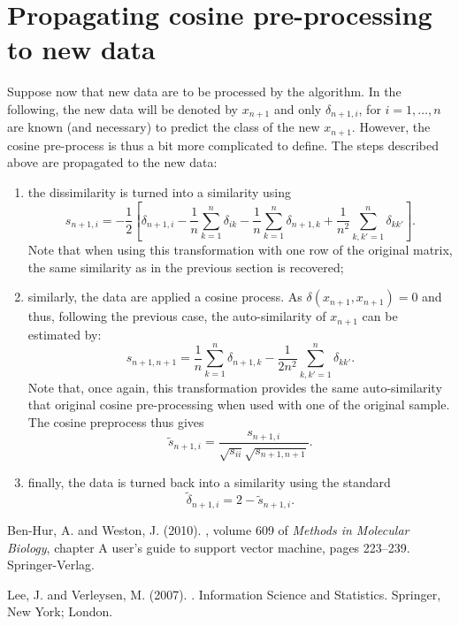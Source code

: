 \documentclass[a4paper,10pt]{scrartcl}
\begin{document}
\section{Propagating cosine pre-processing to new data}

Suppose now that new data are to be processed by the algorithm. In the
following, the new data will be denoted by $x_{n+1}$ and only $\delta_{n+1,i}$,
for $i=1,\ldots,n$ are known (and necessary) to predict the class of the new
$x_{n+1}$. However, the cosine pre-process is thus a bit more complicated to
define. The steps described above are propagated to the new data:
\begin{enumerate}
	\item the dissimilarity is turned into a similarity using
	\[
		s_{n+1,i} = -\frac{1}{2} \left[\delta_{n+1,i} -\frac{1}{n} \sum_{k=1}^n
\delta_{ik} - \frac{1}{n} \sum_{k=1}^n \delta_{n+1,k} + \frac{1}{n^2}
\sum_{k,k'=1}^n \delta_{kk'}\right].
	\]
	Note that when using this transformation with one row of the original matrix,
the same similarity as in the previous section is recovered;
	\item similarly, the data are applied a cosine process. As
$\delta(x_{n+1},x_{n+1})=0$ and thus, following the previous case, the
auto-similarity of $x_{n+1}$ can be estimated by:
	\[
		s_{n+1,n+1} = \frac{1}{n} \sum_{k=1}^n \delta_{n+1,k} - \frac{1}{2n^2}
\sum_{k,k'=1}^n \delta_{kk'}.
	\]
	Note that, once again, this transformation provides the same auto-similarity
that original cosine pre-processing when used with one of the original sample.
The cosine preprocess thus gives
	\[
		\tilde{s}_{n+1,i} = \frac{s_{n+1,i}}{\sqrt{s_{ii}} \sqrt{s_{n+1,n+1}}}.
	\]
	\item finally, the data is turned back into a similarity using the standard
	\[
		\tilde{\delta}_{n+1,i} = 2-\tilde{s}_{n+1,i}.
	\]
\end{enumerate}


% 
% 

\begin{thebibliography}{}

Ben-Hur, A. and Weston, J. (2010).
, volume 609 of
  {\em Methods in Molecular Biology}, chapter A user's guide to support vector
  machine, pages 223--239.
\newblock Springer-Verlag.

Lee, J. and Verleysen, M. (2007).
.
\newblock Information Science and Statistics. Springer, New York; London.

\end{thebibliography}
\end{document}
